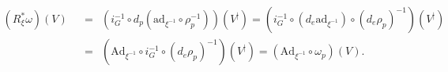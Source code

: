 \documentclass[a4paper,11pt]{article}
\newcommand{\ad}{\textrm{ad}}
\newcommand{\Ad}{\textrm{Ad}}
\begin{document}
\begin{displaymath}
  \begin{split}
    (R^{*}_{\xi}\omega)(V) \,\; &= \,\; (i^{-1}_{G}
    \circ d_{p}(\ad_{\xi^{-1}}\circ\rho_{p}^{-1}))(V^{|})
    = (i^{-1}_{G}\circ(d_{e}\ad_{\xi^{-1}})\circ(d_{e}\rho_{p})^{-1})(V^{|})
    \\
    \,\; &= \,\; (\Ad_{\xi^{-1}}
    \circ i^{-1}_{G} \circ (d_{e}\rho_{p})^{-1})(V^{|})
    = (\Ad_{\xi^{-1}} \circ \omega_{p})(V)\textrm{.}
  \end{split}
\end{displaymath}
\end{document}
